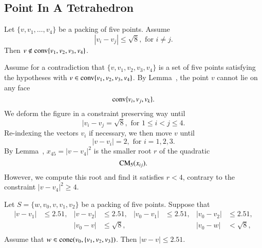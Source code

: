 \begin{tarskidata}
\begin{tarski}
\section{Point In A Tetrahedron}

\begin{lemma} 
Let $\{v,v_1,\ldots,v_4\}$ be a packing of five points.  Assume
	$$ |v_i-v_j| \le \sqrt8, \text{ for } i\ne j.$$
Then $v\not\in {\operatorname{conv}}\{v_1,v_2,v_3,v_4\}$.
\end{lemma}


\begin{proved}  Assume for a contradiction that $\{v,v_1,v_2,v_3,v_4\}$ is a set
of five points satisfying the hypotheses with $v\in{\operatorname{conv}}\{v_1,v_2,v_3,v_4\}$.
By Lemma~, the point $v$ cannot lie on any face
	$${\operatorname{conv}}\{v_i,v_j,v_k\}.$$
We deform the figure in a constraint preserving way until 
	$$
	|v_i-v_j = \sqrt8,\text{ for } 1 \le i < j \le 4.
	$$
Re-indexing the vectors $v_i$ if necessary, we then move $v$ until
	$$
	|v-v_i| = 2, \text{ for } i=1,2,3.
	$$
By Lemma~, $x_{45}=|v-v_4|^2$ is the smaller root $r$ of the quadratic
	$${\operatorname{CM}}_5(x_{ij}).$$
However, we compute this root and find it satisfies $r < 4$, contrary to the
constraint $|v-v_4|^2 \ge 4$.
\swallowed\end{proved}
\end{tarski}






\begin{tarski}

\begin{lemma}
Let $S=\{w,v_0,v,v_1,v_2\}$ be a packing of five points.
Suppose that
  $$\begin{array}{rlrlrlrl}
    |v-v_1|&\le 2.51, &
    |v-v_2|&\le 2.51, &
    |v_0-v_1|&\le 2.51,&
    |v_0-v_2|&\le 2.51,\\
    && |v_0-v|&\le \sqrt8,&
    &&|v_0-w|&< \sqrt8,\\
  \end{array}
  $$
Assume that $w\in{\operatorname{cone}}(v_0,\{v_1,v_2,v_3\})$.  %
Then $|w-v|\le 2.51$.
\end{lemma}


\end{tarski}
\end{tarskidata}
